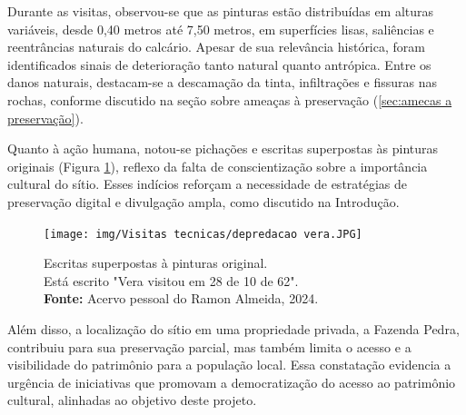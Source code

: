 Durante as visitas, observou-se que as pinturas estão distribuídas em alturas variáveis, desde 0,40 metros até 7,50 metros, em superfícies lisas, saliências e reentrâncias naturais do calcário. Apesar de sua relevância histórica, foram identificados sinais de deterioração tanto natural quanto antrópica. Entre os danos naturais, destacam-se a descamação da tinta, infiltrações e fissuras nas rochas, conforme discutido na seção sobre ameaças à preservação (\ref{sec:amecas a preservação}).

Quanto à ação humana, notou-se pichações e escritas superpostas às pinturas originais (Figura \ref{fig:degradacao vera}), reflexo da falta de conscientização sobre a importância cultural do sítio. Esses indícios reforçam a necessidade de estratégias de preservação digital e divulgação ampla, como discutido na Introdução.
\begin{figure}[H]
    \centering
    \texttt{[image: img/Visitas tecnicas/depredacao vera.JPG]}
    \caption{Escritas superpostas à pinturas original. \\ Está escrito "Vera visitou em 28 de 10 de 62". \\
        \textbf{Fonte:} Acervo pessoal do Ramon Almeida, 2024.}
    \label{fig:degradacao vera}
\end{figure}

Além disso, a localização do sítio em uma propriedade privada, a Fazenda Pedra, contribuiu para sua preservação parcial, mas também limita o acesso e a visibilidade do patrimônio para a população local. Essa constatação evidencia a urgência de iniciativas que promovam a democratização do acesso ao patrimônio cultural, alinhadas ao objetivo deste projeto.

